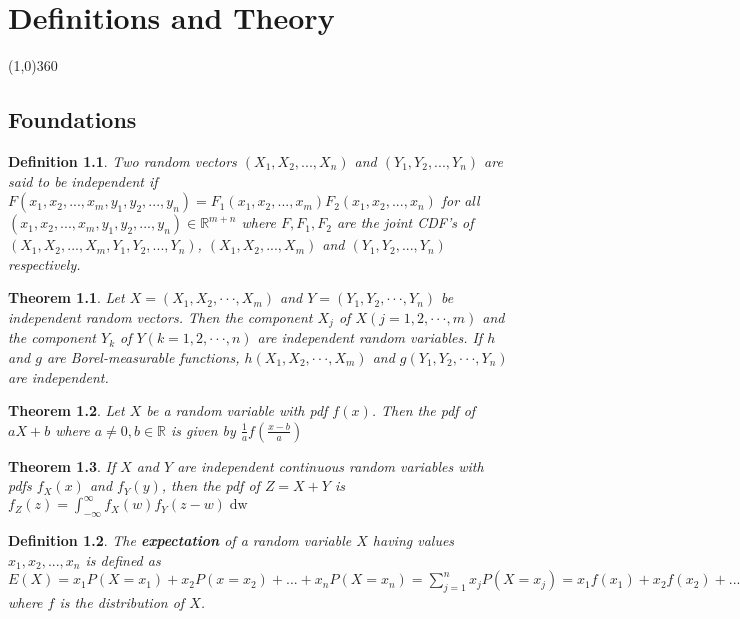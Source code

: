 \documentclass[12pt,twoside]{report}
\newtheorem{defn}{Definition}
\newtheorem{thm}{Theorem}
\begin{document}
\tableofcontents
\newpage
{}

\chapter{Definitions and Theory}
\line(1,0){360} \\

\section{Foundations}

\begin{defn}
    Two random vectors $(X_1, X_2, ..., X_n)$ and $(Y_1, Y_2, ..., Y_n)$ are said to be independent if $F(x_1, x_2, ..., x_m, y_1, y_2, ..., y_n) = F_1 (x_1, x_2, ..., x_m) F_2 (x_1, x_2, ..., x_n)$ for all $(x_1, x_2, ..., x_m, y_1, y_2, ..., y_n) \in \mathbb{R}^{m+n}$ where $F, F_1, F_2$ are the joint CDF's of $(X_1, X_2, ..., X_m, Y_1, Y_2, ..., Y_n)$, $(X_1, X_2, ..., X_m)$ and $(Y_1, Y_2, ..., Y_n)$ respectively.
\end{defn}

\begin{thm}
    Let $X = (X_1, X_2, · · · , X_m)$ and $Y = (Y_1, Y_2, · · · , Y_n)$ be independent random vectors. Then the component $X_j$ of $X(j = 1, 2, · · · , m)$ and the component $Y_k$ of $Y(k = 1, 2, · · · , n)$ are independent random variables. If $h$ and $g$ are Borel-measurable functions, $h(X_1, X_2, · · · , X_m)$ and $g(Y_1, Y_2, · · · , Y_n)$ are independent.
\end{thm}

\begin{thm}
    Let $X$ be a random variable with pdf $f(x)$. Then the pdf of $aX+b$ where $a \neq 0, b \in \mathbb{R}$ is given by $\displaystyle \frac{1}{a} f \left (\frac{x-b}{a} \right)$
\end{thm}

\begin{thm}
    If $X$ and $Y$ are independent continuous random variables with pdfs $f_X(x)$ and $f_Y(y)$, then the pdf of $Z = X+Y$ is $f_Z\left (z\right ) = \displaystyle\int_{- \infty}^\infty f_X \left (w\right ) f_Y \left (z - w\right ) \mathop{\mathrm{d} w}$
\end{thm}

\begin{defn}
    The \textbf{expectation} of a random variable $X$ having values $x_1, x_2, ..., x_n$ is defined as $E\left (X\right ) = x_1  P\left (X = x_1\right ) + x_2 P\left (x = x_2\right ) + ... + x_n P\left (X = x_n\right ) =  \sum_{j = 1}^n x_j P\left (X = x_j\right ) = x_1 f\left (x_1\right ) + x_2 f\left (x_2\right ) + ... + x_n f\left (x_n\right ) = \sum_{j=1} \to n x_j f\left (x_j\right )$ where $f$ is the distribution of $X$.
\end{defn}
\end{document}
